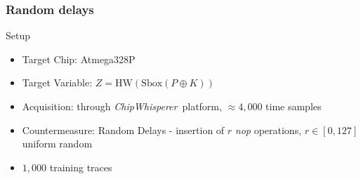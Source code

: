 \begin{frame}
\vspace*{-5pt}
\frametitle{Random delays}
\vspace{-18pt}
\begin{figure}

\end{figure}
\vspace*{-13pt}
\begin{block}{Setup}

\begin{itemize}
\item Target Chip: Atmega328P 
\item Target Variable: $Z = \mathrm{HW}(\mathrm{Sbox}(P\oplus K))$
\item Acquisition: through \emph{ChipWhisperer}\textregistered\ platform, $\approx 4,000$ time samples
\item Countermeasure: Random Delays - insertion of $r$ \emph{nop} operations, $r \in [0,127]$ uniform random
\item $1,000$ training traces

\end{itemize}
\end{block}


\end{frame}

